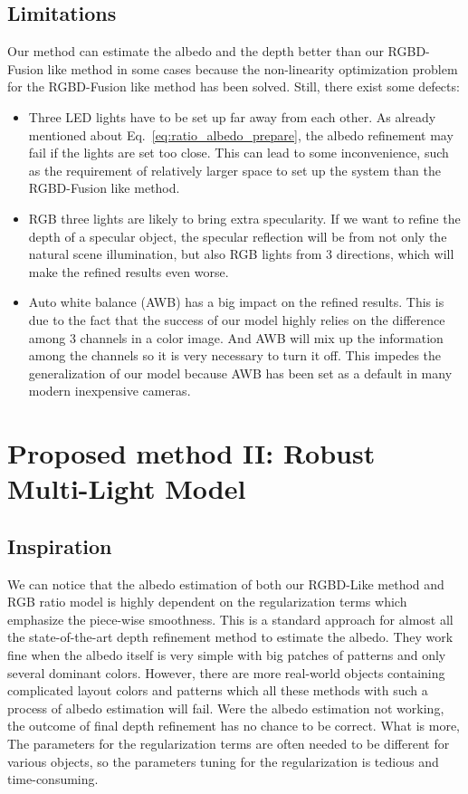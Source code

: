 \subsection{Limitations}
Our method can estimate the albedo and the depth better than our RGBD-Fusion like method in some cases because the non-linearity optimization problem for the RGBD-Fusion like method has been solved.
Still, there exist some defects:
\begin{itemize}
\item Three LED lights have to be set up far away from each other.
    As already mentioned about Eq.~\ref{eq:ratio_albedo_prepare}, the albedo refinement may fail if the lights are set too close.
    This can lead to some inconvenience, such as the requirement of relatively larger space to set up the system than the RGBD-Fusion like method.
\item RGB three lights are likely to bring extra specularity.
     If we want to refine the depth of a specular object, the specular reflection will be from not only the natural scene illumination, but also RGB lights from 3 directions, which will make the refined results even worse.
     
\item Auto white balance (AWB) has a big impact on the refined results.
    This is due to the fact that the success of our model highly relies on the difference among 3 channels in a color image.
    And AWB will mix up the information among the channels so it is very necessary to turn it off.
    This impedes the generalization of our model because AWB has been set as a default in many modern inexpensive cameras.
\end{itemize}


\section{Proposed method II: Robust Multi-Light Model}

\subsection{Inspiration}
We can notice that the albedo estimation of both our RGBD-Like method and RGB ratio model is highly dependent on the regularization terms which emphasize the piece-wise smoothness.
This is a standard approach for almost all the state-of-the-art depth refinement method to estimate the albedo.
They work fine when the albedo itself is very simple with big patches of patterns and only several dominant colors.
However, there are more real-world objects containing complicated layout colors and patterns which all these methods with such a process of albedo estimation will fail.
Were the albedo estimation not working, the outcome of final depth refinement has no chance to be correct. 
What is more, The parameters for the regularization terms are often needed to be different for various objects, so the parameters tuning for the regularization is tedious and time-consuming.

